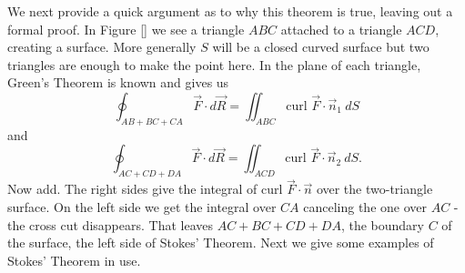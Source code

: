 We next provide a quick argument as to why this theorem is true, leaving out a formal proof.  In Figure \ref{} we see a triangle $ABC$ attached to a triangle $ACD$, creating a surface.  More generally $S$ will be a closed curved surface but two triangles are enough to make the point here.  In the plane of each triangle, Green's Theorem is known and gives us
$$\oint_{AB+BC+CA} \vec F \cdot d\vec R = \iint_{ABC} \text{curl } \vec F \cdot \vec n_1 \: dS$$
and
$$\oint_{AC+CD+DA} \vec F \cdot d\vec R = \iint_{ACD} \text{curl } \vec F \cdot \vec n_2 \: dS.$$
Now add.  The right sides give the integral of $\text{curl } \vec F \cdot \vec n$ over the two-triangle surface.  On the left side we get the integral over $CA$ canceling the one over $AC$ - the cross cut disappears.  That leaves $AC + BC + CD + DA$, the boundary $C$ of the surface, the left side of Stokes' Theorem. Next we give some examples of Stokes' Theorem in use.\\

\\

